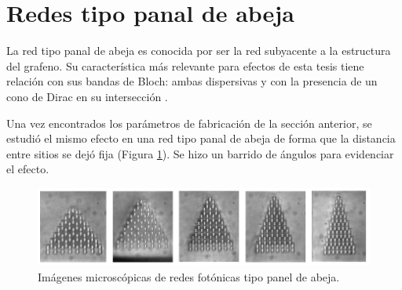 \section{Redes tipo panal de abeja}
La red tipo panal de abeja es conocida por ser la red subyacente a la estructura del grafeno. Su característica más relevante para efectos de esta tesis tiene relación con sus bandas de Bloch: ambas dispersivas y con la presencia de un cono de Dirac en su intersección \citep{honeycombdirac}.

Una vez encontrados los parámetros de fabricación de la sección anterior, se estudió el mismo efecto en una red tipo panal de abeja de forma que la distancia entre sitios se dejó fija (Figura \ref{fig:HCLBW}). Se hizo un barrido de ángulos para evidenciar el efecto. 
\begin{figure}[H]
\centering
	\includegraphics[width=\linewidth]{media/honeycomb_lattices_bw.png}
	\caption{Imágenes microscópicas de redes fotónicas tipo panel de abeja.\label{fig:HCLBW}}
\end{figure}